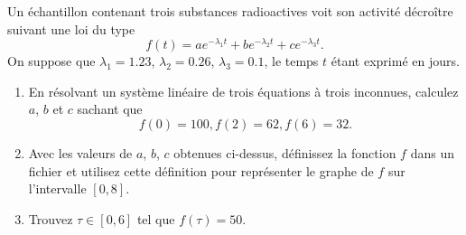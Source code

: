 \begin{exercice}\label{exoMatlab0031}

Un échantillon contenant trois substances radioactives voit son activité décroître suivant une loi du type
\[ f(t) = ae^{-\lambda_1t} + be^{-\lambda_2t} + ce^{-\lambda_3t} . \]
On suppose que $\lambda_1 = 1.23$, $\lambda_2 = 0.26$, $\lambda_3 = 0.1$, le temps $t$ étant exprimé en jours.
\begin{enumerate}
\item En résolvant un système linéaire de trois équations à trois inconnues, calculez $a$, $b$ et $c$ sachant que
\[ f(0) = 100, f(2) = 62 , f(6) = 32 . \]
\item Avec les valeurs de $a$, $b$, $c$ obtenues ci-dessus, définissez la fonction $f$ dans un fichier et utilisez cette définition pour représenter le graphe de $f$ sur l'intervalle $[0,8]$.
\item Trouvez $\tau\in[0,6]$ tel que $f(\tau) = 50$.
\end{enumerate}

\end{exercice}
